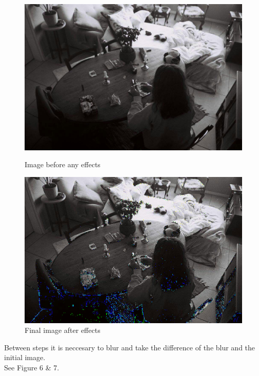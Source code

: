 \documentclass{article}
\begin{document}
\begin{figure}[h!]
\centering
  \begin{minipage}[b]{0.45\textwidth}
    \includegraphics[width=\textwidth]{Q2.jpg}
    \caption{Image before any effects}
  \end{minipage}
  \hfill
  \begin{minipage}[b]{0.45\textwidth}
    \includegraphics[width=\textwidth]{Q2_fin.png}
    \caption{Final image after effects}
  \end{minipage}
 \end{figure}

Between steps it is neccesary to blur and take the difference of the blur and the initial image.
\\See Figure 6 \& 7.
\end{document}
